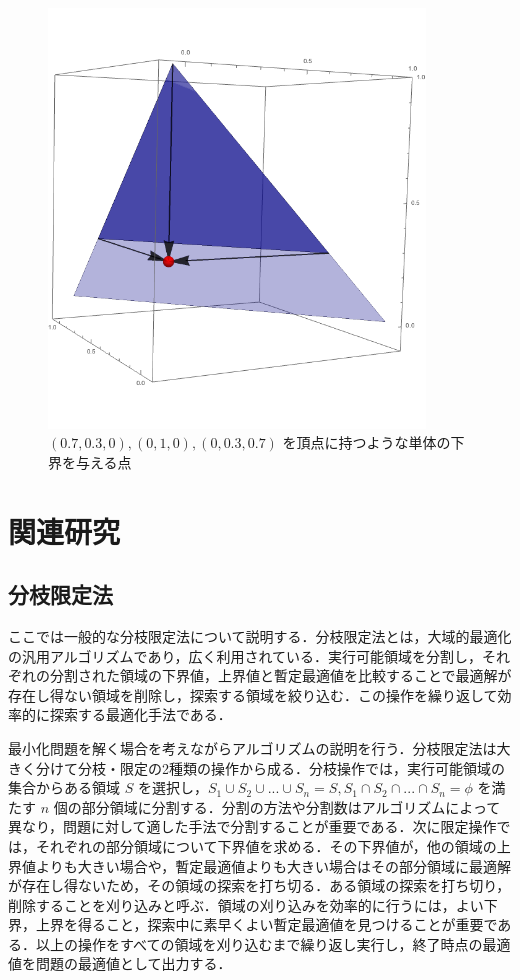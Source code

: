 \documentclass[a4paper,11pt]{jreport}
\begin{document}
\begin{figure}
\begin{center}
\includegraphics[width=10cm]{graphs/lower_bound_of_simplex.png}
\caption{$ (0.7, 0.3, 0), (0, 1, 0), (0, 0.3, 0.7) $ を頂点に持つような単体の下界を与える点}
\label{fig:lower_bound_of_simplex}
\end{center}
\end{figure}

\chapter{関連研究}

\section{分枝限定法}

ここでは一般的な分枝限定法について説明する．分枝限定法とは，大域的最適化の汎用アルゴリズムであり，広く利用されている．実行可能領域を分割し，それぞれの分割された領域の下界値，上界値と暫定最適値を比較することで最適解が存在し得ない領域を削除し，探索する領域を絞り込む．この操作を繰り返して効率的に探索する最適化手法である．\par
最小化問題を解く場合を考えながらアルゴリズムの説明を行う．分枝限定法は大きく分けて分枝・限定の2種類の操作から成る．分枝操作では，実行可能領域の集合からある領域 $ S $ を選択し，$ S_1 \cup S_2 \cup ... \cup S_n = S, S_1 \cap S_2 \cap ... \cap S_n = \phi $ を満たす $ n $ 個の部分領域に分割する．分割の方法や分割数はアルゴリズムによって異なり，問題に対して適した手法で分割することが重要である．次に限定操作では，それぞれの部分領域について下界値を求める．その下界値が，他の領域の上界値よりも大きい場合や，暫定最適値よりも大きい場合はその部分領域に最適解が存在し得ないため，その領域の探索を打ち切る．ある領域の探索を打ち切り，削除することを刈り込みと呼ぶ．領域の刈り込みを効率的に行うには，よい下界，上界を得ること，探索中に素早くよい暫定最適値を見つけることが重要である．以上の操作をすべての領域を刈り込むまで繰り返し実行し，終了時点の最適値を問題の最適値として出力する．\par
\end{document}
